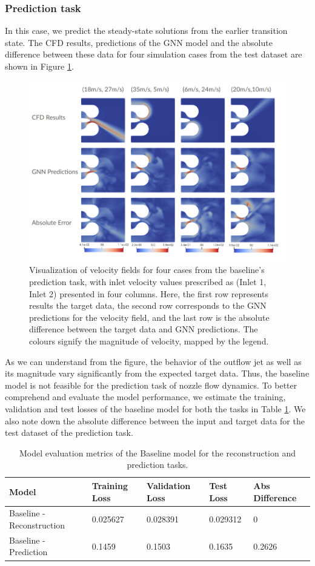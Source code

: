 \subsubsection{Prediction task}
In this case, we predict the steady-state solutions from the earlier transition state. The CFD results, predictions of the GNN model and the absolute difference between these data for four simulation cases from the test dataset are shown in Figure \ref{blpred}.
\begin{figure}[ht]
    \centering
    \includegraphics[width=14cm]{images/Methodology/Baselineprediction.png}
    \caption{Visualization of velocity fields for four cases from the baseline's prediction task, with inlet velocity values prescribed as (Inlet 1, Inlet 2) presented in four columns. Here, the first row represents results the target data, the second row corresponds to the GNN predictions for the velocity field, and the last row is the absolute difference between the target data and GNN predictions. The colours signify the magnitude of velocity, mapped by the legend.} 
    \label{blpred}
\end{figure}
As we can understand from the figure, the behavior of the outflow jet as well as its magnitude vary significantly from the expected target data. Thus, the baseline model is not feasible for the prediction task of nozzle flow dynamics. To better comprehend and evaluate the model performance, we estimate the training, validation and test losses of the baseline model for both the tasks in Table \ref{table:perform}. We also note down the absolute difference between the input and target data for the test dataset of the prediction task.  
\begin{table}[ht]
    \centering
    \caption{Model evaluation metrics of the Baseline model for the reconstruction and prediction tasks.} 
    \label{table:perform}
    \begin{tabular}{|l|l|l|l|l|}
    \hline
    \textbf{Model} & \textbf{Training Loss} & \textbf{Validation Loss} & \textbf{Test Loss} & \textbf{Abs Difference} \\
    \hline
    Baseline - Reconstruction & 0.025627 & 0.028391 & 0.029312 & 0\\
    \hline
    Baseline - Prediction & 0.1459 & 0.1503 & 0.1635 & 0.2626\\
    \hline
    \end{tabular}
    \end{table}   
